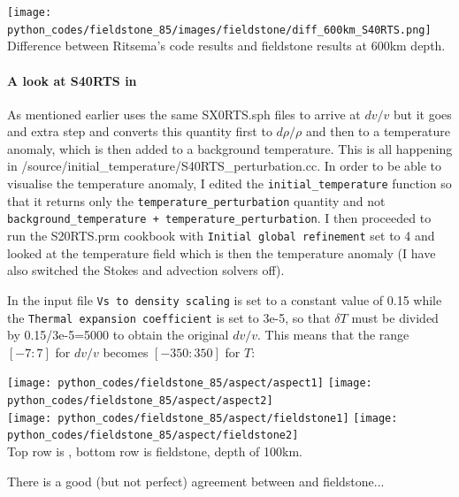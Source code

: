\begin{center}
\texttt{[image: python\_codes/fieldstone\_85/images/fieldstone/diff\_600km\_S40RTS.png]}\\
{\captionfont Difference between Ritsema's code results and fieldstone results at 600\si{km} depth.}
\end{center}

\newpage
\paragraph{A look at S40RTS in \aspect} As mentioned earlier \aspect{} uses 
the same {\filenamefont SX0RTS.sph} files to arrive at $dv/v$ but it goes and extra 
step and converts this quantity first to $d\rho/\rho$ and then to a temperature 
anomaly, which is then added to a background temperature.
This is all happening in {\filenamefont /source/initial\_temperature/S40RTS\_perturbation.cc}.
In order to be able to visualise the temperature anomaly, I 
edited the \texttt{initial\_temperature} function so that it returns only the 
\texttt{temperature\_perturbation} quantity and not \texttt{background\_temperature + temperature\_perturbation}.
I then proceeded to run the {\filenamefont S20RTS.prm} cookbook with \texttt{Initial global refinement} set to 4
and looked at the temperature field which is then 
the temperature anomaly (I have also switched the Stokes and advection solvers off).

In the input file \texttt{Vs to density scaling} is set to a constant value of 0.15 while 
the \texttt{Thermal expansion coefficient} is set to 3e-5, so that $\delta T$ must be 
divided by 0.15/3e-5=5000 to obtain the original $dv/v$. This means that the 
range $[-7:7]$ for $dv/v$ becomes $[-350:350]$ for $T$:

\begin{center}
\texttt{[image: python\_codes/fieldstone\_85/aspect/aspect1]}
\texttt{[image: python\_codes/fieldstone\_85/aspect/aspect2]}\\
\texttt{[image: python\_codes/fieldstone\_85/aspect/fieldstone1]}
\texttt{[image: python\_codes/fieldstone\_85/aspect/fieldstone2]}\\
{\captionfont Top row is \aspect{}, bottom row is fieldstone, depth of 100km.}
\end{center}

There is a good (but not perfect) agreement between \aspect{} and fieldstone...








